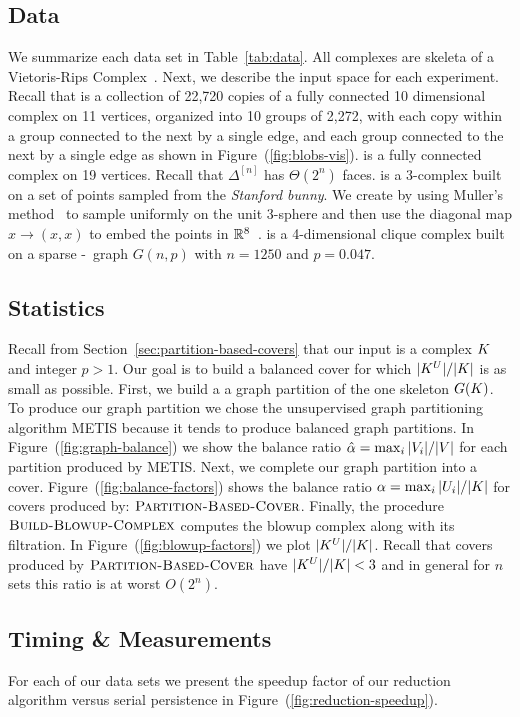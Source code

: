 \documentclass{elsarticle}
\begin{document}
\subsection{Data}
 
We summarize each data set in Table~\ref{tab:data}.  All complexes are skeleta of a Vietoris-Rips Complex~\cite{z-fcv-10}.  
Next, we describe the input space for each experiment. 
Recall that {\blobs} is a collection of 22,720 copies of a fully connected 10 dimensional complex on 11 vertices, organized
into 10 groups of 2,272, with each 
copy within a group connected to the next by a single edge, and each group connected to the next by a single edge as shown in Figure~(\ref{fig:blobs-vis}). 
{\clique} is a fully connected complex on 19 vertices. Recall that $\Delta^{[n]}$ has $\Theta(2^n)$ 
faces. {\bunny} is a 3-complex built on a set of points sampled from the 
\emph{Stanford bunny}. We create {\sphere} by using Muller's method~\cite{m-nmgpuns-59} to sample 
uniformly on the unit 3-sphere and then use the diagonal map
$x \rightarrow (x,x)$ to embed the points in $\mathbb{R}^8$~\cite{hatcher}. {\gnp} is a 
4-dimensional clique complex built on a sparse \Erdos-\Renyi\ graph $G(n,p)$ 
with $n = 1250$ and $p = 0.047$.

\subsection{Statistics}

Recall from Section~\ref{sec:partition-based-covers} that our input is a complex
$K$ and integer $p > 1$. Our goal is to build a balanced cover for 
which $|K^{U}|/|K|$ is as small as possible. First, we build a a graph partition of
the one skeleton $G(K)$. To produce our graph partition we chose the
unsupervised graph partitioning algorithm METIS because it tends to produce 
balanced graph partitions. In Figure~(\ref{fig:graph-balance}) we show the balance
ratio $\hat{\alpha} = \max_i{|V_i|}/|V|$ for each partition produced by METIS.
Next, we complete our graph partition into a cover. Figure~(\ref{fig:balance-factors})
shows the balance ratio $\alpha = \max_i{|U_i|}/|K|$ for covers
produced by: $\textnormal{\scshape Partition-Based-Cover}$.
Finally, the procedure $\textnormal{\scshape Build-Blowup-Complex}$ 
computes the blowup complex along with its filtration. 
In Figure~(\ref{fig:blowup-factors}) we plot $|K^{U}|/|K|$. Recall that 
covers produced by $\textnormal{\scshape Partition-Based-Cover}$ have
$|K^{U}|/|K| < 3$ and in general for $n$ sets this ratio is at worst $O(2^n)$. 

\subsection{Timing \& Measurements}
For each of our data sets we present the speedup factor of
our reduction algorithm versus serial persistence in Figure~(\ref{fig:reduction-speedup}).
\end{document}
